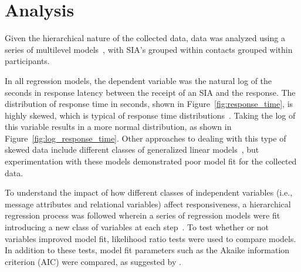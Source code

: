 \documentclass[12pt]{nuthesis}	%
\begin{document}

\section{Analysis}

Given the hierarchical nature of the collected data, data was analyzed using a series of multilevel models~\citep{gelman2007data}, with SIA's grouped within contacts grouped within participants.

In all regression models, the dependent variable was the natural log of the seconds in response latency between the receipt of an SIA and the response. The distribution of response time in seconds, shown in Figure~\ref{fig:response_time}, is highly skewed, which is typical of response time distributions~\citep{kalman2006pauses}. Taking the log of this variable results in a more normal distribution, as shown in Figure~\ref{fig:log_response_time}. Other approaches to dealing with this type of skewed data include different classes of generalized linear models~\citep[see e.g.,][]{buntin2004too,dick2004beyond,manning2001estimating}, but experimentation with these models demonstrated poor model fit for the collected data.

To understand the impact of how different classes of independent variables (i.e., message attributes and relational variables) affect responsiveness, a hierarchical regression process was followed wherein a series of regression models were fit introducing a new class of variables at each step~\citep{gurnsey2017statistics}. To test whether or not variables improved model fit, likelihood ratio tests were used to compare models. In addition to these tests, model fit parameters such as the Akaike information criterion (AIC) were compared, as suggested by \citet{gelman2007data}.
\end{document}
